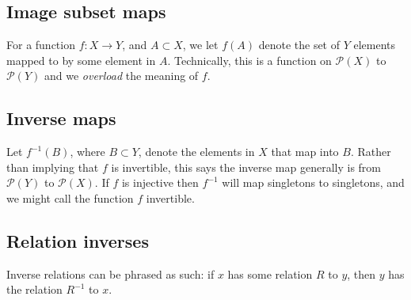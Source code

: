 \documentclass{article}
\newcommand{\pow}[1]{\mathscr{P}(#1)}
\begin{document}
\subsection{Image subset maps}

For a function $f: X \longrightarrow Y$, and $A \subset X$, we let $f(A)$ denote the set of $Y$ elements mapped to by some element in $A$. Technically, this is a function on $\pow{X}$ to $\mathscr{P}(Y)$ and we \textit{overload} the meaning of $f$. 

\subsection{Inverse maps}

Let $f^{-1}(B)$, where $B \subset Y$, denote the elements in $X$ that map into $B$. Rather than implying that $f$ is invertible, this says the inverse map generally is from $\pow{Y}$ to $\pow{X}$. If $f$ is injective then $f^{-1}$ will map singletons to singletons, and we might call the function $f$ invertible.

\subsection{Relation inverses}

Inverse relations can be phrased as such: if $x$ has some relation $R$ to $y$, then $y$ has the relation $R^{-1} $ to $x$.
\end{document}
